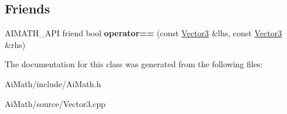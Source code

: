 \subsection*{Friends}
\begin{DoxyCompactItemize}
\item 
\hypertarget{class_ai_math_1_1_vector3_a9e3ec7ba4db1dba5a8aa153c44acb60d}{A\+I\+M\+A\+T\+H\+\_\+\+A\+P\+I friend bool {\bfseries operator==} (const \hyperlink{class_ai_math_1_1_vector3}{Vector3} \&lhs, const \hyperlink{class_ai_math_1_1_vector3}{Vector3} \&rhs)}\label{class_ai_math_1_1_vector3_a9e3ec7ba4db1dba5a8aa153c44acb60d}

\end{DoxyCompactItemize}


The documentation for this class was generated from the following files\+:\begin{DoxyCompactItemize}
\item 
Ai\+Math/include/Ai\+Math.\+h\item 
Ai\+Math/source/Vector3.\+cpp\end{DoxyCompactItemize}
